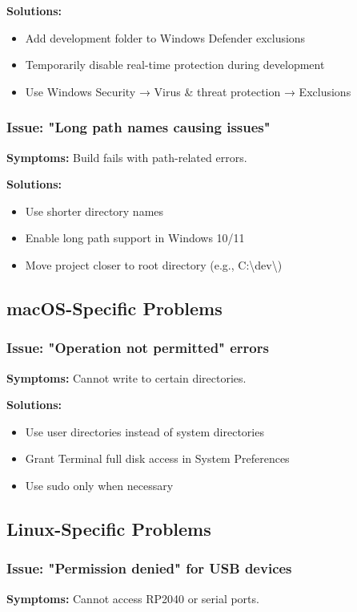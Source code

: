 \documentclass[11pt,a4paper]{article}
\begin{document}
\textbf{Solutions:}
\begin{itemize}
    \item Add development folder to Windows Defender exclusions
    \item Temporarily disable real-time protection during development
    \item Use Windows Security → Virus \& threat protection → Exclusions
\end{itemize}

\subsubsection{Issue: "Long path names causing issues"}
\textbf{Symptoms:} Build fails with path-related errors.

\textbf{Solutions:}
\begin{itemize}
    \item Use shorter directory names
    \item Enable long path support in Windows 10/11
    \item Move project closer to root directory (e.g., C:\textbackslash dev\textbackslash)
\end{itemize}

\subsection{macOS-Specific Problems}

\subsubsection{Issue: "Operation not permitted" errors}
\textbf{Symptoms:} Cannot write to certain directories.

\textbf{Solutions:}
\begin{itemize}
    \item Use user directories instead of system directories
    \item Grant Terminal full disk access in System Preferences
    \item Use sudo only when necessary
\end{itemize}

\subsection{Linux-Specific Problems}

\subsubsection{Issue: "Permission denied" for USB devices}
\textbf{Symptoms:} Cannot access RP2040 or serial ports.
\end{document}
